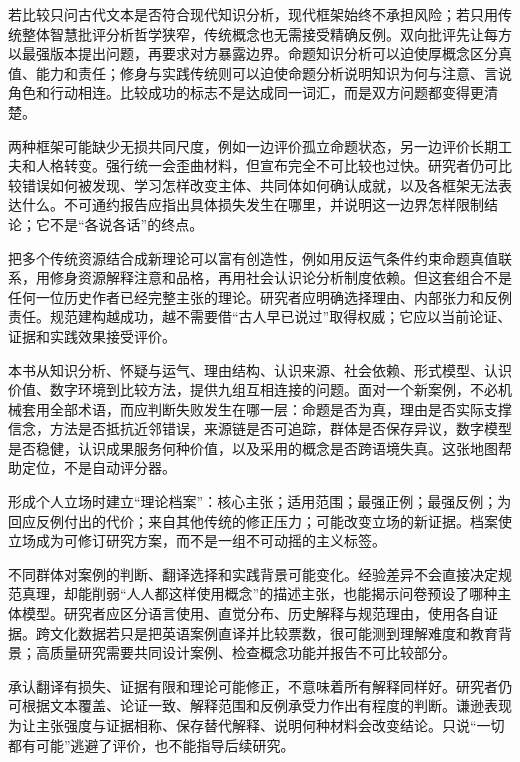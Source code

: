 若比较只问古代文本是否符合现代知识分析，现代框架始终不承担风险；若只用传统整体智慧批评分析哲学狭窄，传统概念也无需接受精确反例。双向批评先让每方以最强版本提出问题，再要求对方暴露边界。命题知识分析可以迫使厚概念区分真值、能力和责任；修身与实践传统则可以迫使命题分析说明知识为何与注意、言说角色和行动相连。比较成功的标志不是达成同一词汇，而是双方问题都变得更清楚。

两种框架可能缺少无损共同尺度，例如一边评价孤立命题状态，另一边评价长期工夫和人格转变。强行统一会歪曲材料，但宣布完全不可比较也过快。研究者仍可比较错误如何被发现、学习怎样改变主体、共同体如何确认成就，以及各框架无法表达什么。不可通约报告应指出具体损失发生在哪里，并说明这一边界怎样限制结论；它不是“各说各话”的终点。

把多个传统资源结合成新理论可以富有创造性，例如用反运气条件约束命题真值联系，用修身资源解释注意和品格，再用社会认识论分析制度依赖。但这套组合不是任何一位历史作者已经完整主张的理论。研究者应明确选择理由、内部张力和反例责任。规范建构越成功，越不需要借“古人早已说过”取得权威；它应以当前论证、证据和实践效果接受评价。

本书从知识分析、怀疑与运气、理由结构、认识来源、社会依赖、形式模型、认识价值、数字环境到比较方法，提供九组互相连接的问题。面对一个新案例，不必机械套用全部术语，而应判断失败发生在哪一层：命题是否为真，理由是否实际支撑信念，方法是否抵抗近邻错误，来源链是否可追踪，群体是否保存异议，数字模型是否稳健，认识成果服务何种价值，以及采用的概念是否跨语境失真。这张地图帮助定位，不是自动评分器。

\begin{argumentbox}
形成个人立场时建立“理论档案”：核心主张；适用范围；最强正例；最强反例；为回应反例付出的代价；来自其他传统的修正压力；可能改变立场的新证据。档案使立场成为可修订研究方案，而不是一组不可动摇的主义标签。
\end{argumentbox}

不同群体对案例的判断、翻译选择和实践背景可能变化。经验差异不会直接决定规范真理，却能削弱“人人都这样使用概念”的描述主张，也能揭示问卷预设了哪种主体模型。研究者应区分语言使用、直觉分布、历史解释与规范理由，使用各自证据。跨文化数据若只是把英语案例直译并比较票数，很可能测到理解难度和教育背景；高质量研究需要共同设计案例、检查概念功能并报告不可比较部分。

承认翻译有损失、证据有限和理论可能修正，不意味着所有解释同样好。研究者仍可根据文本覆盖、论证一致、解释范围和反例承受力作出有程度的判断。谦逊表现为让主张强度与证据相称、保存替代解释、说明何种材料会改变结论。只说“一切都有可能”逃避了评价，也不能指导后续研究。

